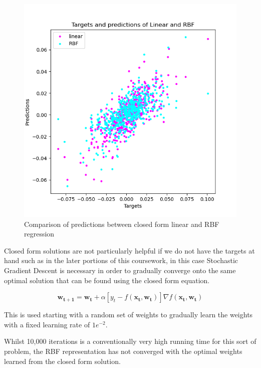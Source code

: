 \documentclass[sigconf]{acmart}
\begin{document}
\begin{figure}[h]
  \centering
  \includegraphics[scale=0.35]{../RBF-R/CF.png}
  \caption{Comparison of predictions between closed form linear and RBF regression}
  \label{fig:CF}
\end{figure}

Closed form solutions are not particularly helpful if we do not have the targets at hand such as in the later portions of this coursework, in this case Stochastic Gradient Descent is necessary in order to gradually converge onto the same optimal solution that can be found using the closed form equation.

\begin{equation}
  \mathbf{w_{t+1}} = \mathbf{w_t} + \alpha[y_t - f(\mathbf{x_t}, \mathbf{w_t})]\nabla f(\mathbf{x_t}, \mathbf{w_t})
\end{equation}

This is used starting with a random set of weights to gradually learn the weights with a fixed learning rate of $1e^{-2}$.

Whilst 10,000 iterations is a conventionally very high running time for this sort of problem, the RBF representation has not converged with the optimal weights learned from the closed form solution.
\end{document}
